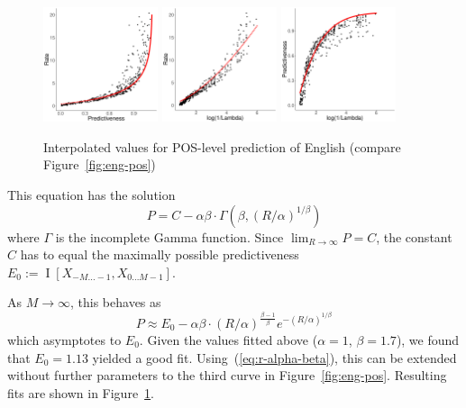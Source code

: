 \documentclass[entropy,article,submit,moreauthors,pdftex,10pt,a4paper]{Definitions/mdpi}
\begin{document}
\begin{figure}
\includegraphics[width=0.3\textwidth]{code/figures/english-info-fitted.pdf}
\includegraphics[width=0.3\textwidth]{code/figures/english-logbeta-mem-fitted.pdf}
	\includegraphics[width=0.3\textwidth]{code/figures/english-nlogbeta-ee-fitted.pdf}
	\caption{Interpolated values for POS-level prediction of English (compare Figure~\ref{fig:eng-pos}) }\label{fig:eng-pos-fitted}
\end{figure}


This equation has the solution
\begin{equation}\label{eq:sol}
	P = C - \alpha\beta \cdot \Gamma\left(\beta, (R/\alpha)^{1/\beta}\right)
\end{equation}
where $\Gamma$ is the incomplete Gamma function.
Since $\lim_{R \rightarrow \infty} P = C$, the constant $C$ has to equal the maximally possible predictiveness $E_0 := \operatorname{I}[X_{-M\dots -1}, X_{0 \dots M-1}]$.

As $M \rightarrow \infty$, this behaves as
\begin{equation}
	P \approx E_0 - \alpha\beta \cdot (R/\alpha)^{\frac{\beta-1}{\beta}} e^{-(R/\alpha)^{1/\beta}}
\end{equation}
which asymptotes to $E_0$.
Given the values fitted above ($\alpha=1$, $\beta=1.7$), we found that $E_0 = 1.13$ yielded a good fit.
Using~(\ref{eq:r-alpha-beta}), this can be extended without further parameters to the third curve in Figure~\ref{fig:eng-pos}.
Resulting fits are shown in Figure~\ref{fig:eng-pos-fitted}.
\end{document}
